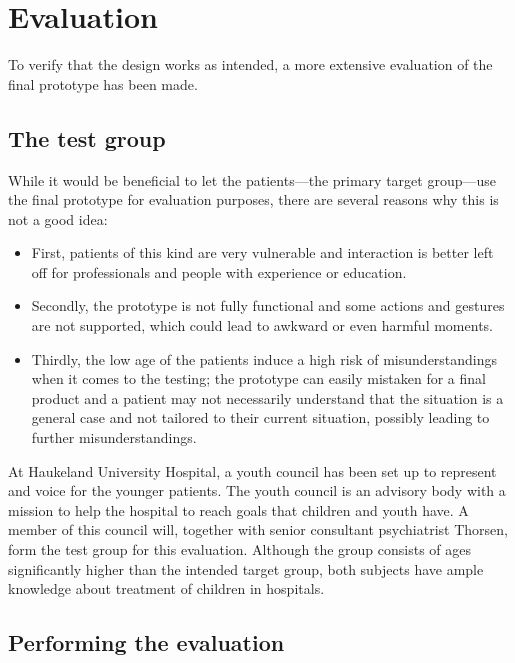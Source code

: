 \chapter{Evaluation}
\label{ch:evaluation}

To verify that the design works as intended, a more extensive evaluation of the final prototype has been made.

\section{The test group}
\label{sec:testgroup}

While it would be beneficial to let the patients---the primary target group---use the final prototype for evaluation purposes, there are several reasons why this is not a good idea:

\begin{itemize}
    \item First, patients of this kind are very vulnerable and interaction is better left off for professionals and people with experience or education.
    \item Secondly, the prototype is not fully functional and some actions and gestures are not supported, which could lead to awkward or even harmful moments.
    \item Thirdly, the low age of the patients induce a high risk of misunderstandings when it comes to the testing; the prototype can easily mistaken for a final product and a patient may not necessarily understand that the situation is a general case and not tailored to their current situation, possibly leading to further misunderstandings.
\end{itemize}

At Haukeland University Hospital, a youth council has been set up to represent and voice for the younger patients. The youth council is an advisory body with a mission to help the hospital to reach goals that children and youth have. A member of this council will, together with senior consultant psychiatrist Thorsen, form the test group for this evaluation. Although the group consists of ages significantly higher than the intended target group, both subjects have ample knowledge about treatment of children in hospitals.


\section{Performing the evaluation}

